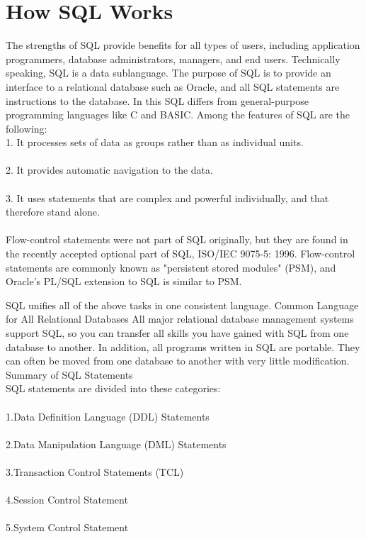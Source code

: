 \documentclass{article}
\begin{document}
\section{How SQL Works}
The strengths of SQL provide benefits for all types of users, including application programmers,
database administrators, managers, and end users. Technically speaking, SQL is a data sublanguage.
The purpose of SQL is to provide an interface to a relational database such as Oracle, and all SQL
statements are instructions to the database. In this SQL differs from general-purpose programming
languages like C and BASIC. Among the features of SQL are the following:
\\
1. It processes sets of data as groups rather than as individual units.\\ \\
2. It provides automatic navigation to the data.\\ \\
3. It uses statements that are complex and powerful individually, and that therefore stand alone.\\ \\
Flow-control statements were not part of SQL originally, but they are found in the recently
accepted optional part of SQL, ISO/IEC 9075-5: 1996. Flow-control statements are commonly
known as "persistent stored modules" (PSM), and Oracle's PL/SQL extension to SQL is
similar to PSM.

SQL unifies all of the above tasks in one consistent language.
Common Language for All Relational Databases
All major relational database management systems support SQL, so you can transfer all skills you
have gained with SQL from one database to another. In addition, all programs written in SQL are
portable. They can often be moved from one database to another with very little modification.
Summary of SQL Statements\\
SQL statements are divided into these categories:\\ \\
1.Data Definition Language (DDL) Statements\\ \\
2.Data Manipulation Language (DML) Statements\\ \\
3.Transaction Control Statements (TCL)\\ \\
4.Session Control Statement\\ \\
5.System Control Statement\\ \\
\end{document}

